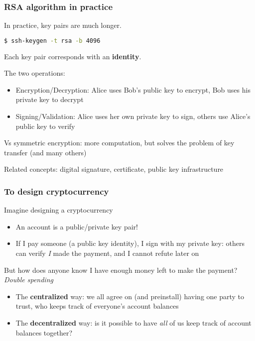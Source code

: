 \documentclass{beamer}
\begin{document}
\begin{frame}[fragile]
\frametitle{RSA algorithm in practice}

In practice, key pairs are much longer.
\begin{lstlisting}[language=bash]
  $ ssh-keygen -t rsa -b 4096
\end{lstlisting}

Each key pair corresponds with an \textbf{identity}.

\vspace{0.2in}

The two operations:
\begin{itemize}
    \item {Encryption/Decryption}: Alice uses Bob's public key to encrypt, Bob uses his private key to decrypt
    \item {Signing/Validation}: Alice uses her own private key to sign, others use Alice's public key to verify
\end{itemize}

\vspace{0.2in}
Vs symmetric encryption: more computation, but solves the problem of key transfer (and many others)

\vspace{0.2in}
Related concepts: digital signature, certificate, public key infrastructure

\end{frame}

\begin{frame}
\frametitle{To design cryptocurrency}

Imagine designing a cryptocurrency
\begin{itemize}
    \item An account is a public/private key pair!
    \item If I pay someone (a public key identity), I sign with my private key: others can verify \textit{I} made the payment, and I cannot refute later on
\end{itemize}

But how does anyone know I have enough money left to make the payment? \textit{Double spending}
\begin{itemize}
    \item The \textbf{centralized} way: we all agree on (and preinstall) having one party to trust, who keeps track of everyone's account balances
    \item The \textbf{decentralized} way: is it possible to have \textit{all} of us keep track of account balances together?
\end{itemize}

\end{frame}
\end{document}
